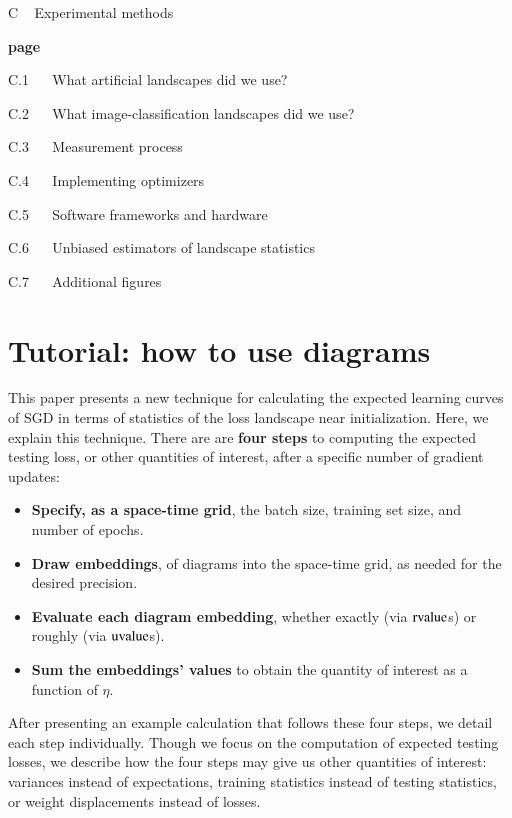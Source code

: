 \documentclass[final,12pt]{colt2021} %
\newcommand{\uvalue}{\text{\textnormal{uvalue}}}
\newcommand{\rvalue}{\text{\textnormal{rvalue}}}
\begin{document}
        {\bf
        \par\noindent C ~ Experimental methods}                                 \hfill {\bf page \pageref{appendix:experiments}}
        \par\indent     C.1 ~~ What artificial landscapes did we use?           \hfill \pageref{appendix:artificial}  
        \par\indent     C.2 ~~ What image-classification landscapes did we use? \hfill \pageref{appendix:natural}
        \par\indent     C.3 ~~ Measurement process                              \hfill \pageref{appendix:measure}
        \par\indent     C.4 ~~ Implementing optimizers                          \hfill \pageref{appendix:optimizers}
        \par\indent     C.5 ~~ Software frameworks and hardware                 \hfill \pageref{appendix:frameworks}
        \par\indent     C.6 ~~ Unbiased estimators of landscape statistics      \hfill \pageref{appendix:bessel}
        \par\indent     C.7 ~~ Additional figures                               \hfill \pageref{appendix:figures}
 
\newpage
\section{Tutorial: how to use diagrams}                \label{appendix:tutorial}
    This paper presents a new technique for calculating the expected learning
    curves of SGD in terms of statistics of the loss landscape near
    initialization.  Here, we explain this technique.
    There are are {\bf four steps} to computing the expected testing loss, or
    other quantities of interest, after a specific number of gradient updates: 
    \begin{itemize}
        \item {\bf Specify, as a space-time grid}, the batch size, training set
            size, and number of epochs. 
        \item {\bf Draw embeddings}, of diagrams into the
            space-time grid, as needed for the desired precision.
        \item {\bf Evaluate each diagram embedding}, whether exactly
            (via $\rvalue$s)
            or roughly
            (via $\uvalue$s).
        \item {\bf Sum the embeddings' values} to obtain the quantity of
              interest as a function of $\eta$.
    \end{itemize}
    \noindent
    After presenting an example calculation that follows these four steps, we
    detail each step individually.  Though we focus on the computation of
    expected testing losses, we describe how the four steps may give us other
    quantities of interest: variances instead of expectations, training
    statistics instead of testing statistics, or weight displacements instead
    of losses.  
\end{document}
